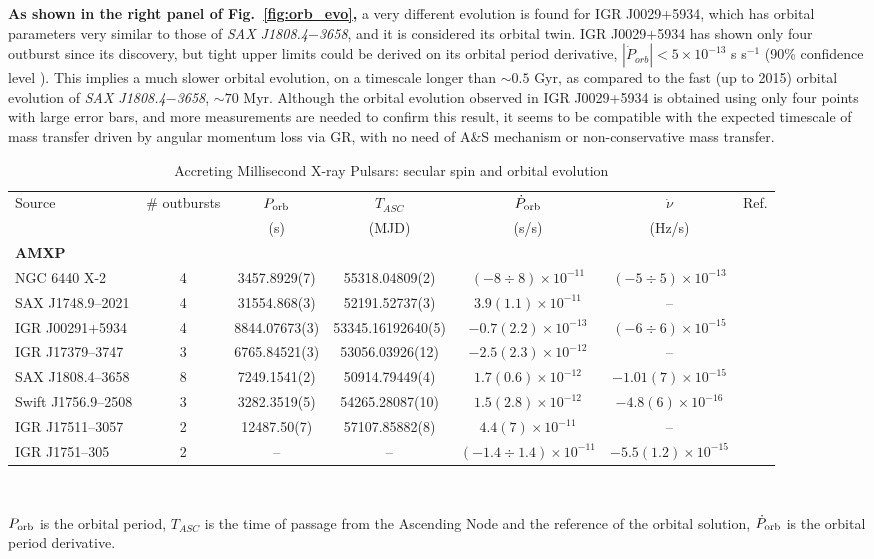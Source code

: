 \documentclass[graybox]{svmult}
\def \saxj{{\em SAX J1808.4$-$3658\xspace}}
\begin{document}
\textbf{As shown in the right panel of Fig.~\ref{fig:orb_evo},} a very different evolution is found for IGR J0029+5934, which has orbital parameters very similar to those of \saxj{}, and it is considered its orbital twin. IGR J0029+5934 has shown only four outburst since its discovery, but tight upper limits could be derived on its orbital period derivative, $|\dot P_{orb}| < 5 \times 10^{-13}$ s s$^{-1}$ (90\% confidence level \cite{Patruno2017,Sanna2017d}). This implies a much slower orbital evolution, on a timescale longer than $\sim 0.5$ Gyr, as compared to the fast (up to 2015) orbital evolution of \saxj{}, $\sim 70$ Myr. Although the orbital evolution observed in IGR J0029+5934 is obtained using only four points with large error bars, and more measurements are needed to confirm this result, it seems to be compatible with the expected timescale of mass transfer driven by angular momentum loss via GR, with no need of A\&S mechanism or non-conservative mass transfer. 

\begin{table}
\caption{Accreting Millisecond X-ray Pulsars: secular spin and orbital evolution}
\scriptsize
\begin{center}
\begin{tabular}{lcccccl}
\hline
\hline
Source & \# outbursts & $P_{\rm orb}$ & $T_{ASC}$  & $\dot{P}_{\rm orb}$ & $\dot{\nu}$ & Ref.\\
 &  & (s) & (MJD) & (s/s) & (Hz/s) &\\
\hline
\textbf{AMXP} & & & & & & \\
\hline
NGC 6440 X-2 & 4 & 3457.8929(7) & 55318.04809(2) &  $(-8\div8)\times 10^{-11}$ &$(-5\div5)\times 10^{-13}$ & \cite{Bult2015c}\\
SAX J1748.9--2021 & 4 & 31554.868(3) & 52191.52737(3) &  $3.9(1.1)\times 10^{-11}$ & --& \cite{Sanna2020}\\
IGR J00291+5934  & 4 & 8844.07673(3) &53345.16192640(5)  & $-0.7(2.2)\times 10^{-13}$ & $(-6\div6)\times 10^{-15} $  &  \cite{Patruno2017,Sanna2017d}\\
IGR J17379--3747  & 3 & 6765.84521(3) & 53056.03926(12) &  $−2.5(2.3)\times 10^{-12}$ & --  & \cite{Sanna2018b}\\
SAX J1808.4--3658 & 8 & 7249.1541(2) & 50914.79449(4) & $1.7(0.6)\times 10^{-12}$ & $-1.01(7)\times 10^{-15}$ & \cite{Bult2019c,Sanna2020b}\\
Swift J1756.9--2508 &3  & 3282.3519(5) &  54265.28087(10) &  $1.5(2.8)\times 10^{-12}$ & $-4.8(6)\times 10^{-16}$ & \cite{Sanna2018d,Bult2018b}\\
IGR J17511--3057 & 2 & 12487.50(7) & 57107.85882(8) & $4.4(7)\times10^{-11}$  & -- &  \cite{Riggio2020} \\
IGR J1751--305 & 2 & -- & -- & $(-1.4\div1.4)\times10^{-11}$  & $-5.5(1.2)\times 10^{-15}$ &  \cite{Riggio2011b}\\
\hline
\hline
\end{tabular}\\
\end{center}
$P_{\rm orb}$ is the orbital period, $T_{ASC}$ is the time of passage from the Ascending Node and the reference of the orbital solution, $\dot{P}_{\rm orb}$ is the orbital period derivative.
\label{Tab2}
\end{table}
\end{document}
